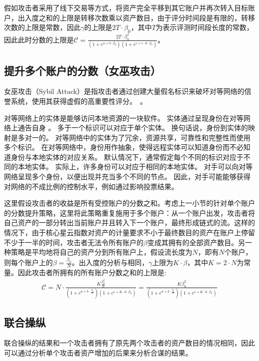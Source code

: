 假如攻击者采用了线下交易等方式，将资产完全平移到其它账户并再次转入目标账户，出入度之和的上限是转移次数乘以资产数目，由于评分时间段是有限的，转移次数的上限是常数，因此$\gamma$的上限是$2T \cdot \beta_0$，其中$T$为表示评测时间段长度的常数，因此此时分数的上限是$\mathcal{C} =  \frac{2T \cdot \beta_0 ^2}{ (1+e^{a + b \cdot \beta_0}) (1+e^{c + c \cdot d \cdot \beta_0})}$。

\subsection{提升多个账户的分数（女巫攻击）}
女巫攻击（Sybil Attack）是指攻击者通过创建大量假名标识来破坏对等网络的信誉系统，使用其获得虚假的高重要性评分。~\cite{quercia2010sybil}。


对等网络上的实体是能够访问本地资源的一块软件。 实体通过呈现身份在对等网络上通告自身 。 多于一个标识可以对应于单个实体。
换句话说，身份到实体的映射是多对一的。 对等网络中的实体为了冗余，资源共享，可靠性和完整性而使用多个标识。
在对等网络中，身份用作抽象，使得远程实体可以知道身份而不必知道身份与本地实体的对应关系。
默认情况下，通常假定每个不同的标识对应于不同的本地实体。 实际上，许多身份可以对应于相同的本地实体。
对手可以向对等网络呈现多个身份，以便出现并充当多个不同的节点。 因此，对手可能能够获得对网络的不成比例的控制水平，例如通过影响投票结果。


这里假设攻击者的收益是所有受控账户的分数之和。考虑上一小节的针对单个账户的分数提升策略，这里将此策略重复施用于多个账户：从一个账户出发，攻击者将自己资产的一部分转出当前账户并且转入下一个账户，最终形成链式的流。这样的情况下，由于核心星云指数对资产的计量要求不小于最终数目的资产在账户上停留不少于一半的时间，攻击者无法令所有账户的$\beta$变成其拥有的全部资产数目。另一种策略是平均地将自己的资产分到所有账户上，假设流长度为$N$，即有$N$个账户，则每个账户上的$\beta = \frac{\beta_0}{N}$。出入度的分析与相同，$\gamma$上限为$K \cdot \beta$，其中$K=2\cdot N$为常量。因此攻击者所拥有的所有账户分数之和的上限是:
\begin{align}
\mathcal{C} = N \cdot \frac{K \frac{\beta_0 ^2}{N}}{ (1+e^{a + b \cdot \frac{\beta_0}{N} }) (1+e^{c + K \cdot d \cdot \beta_0})} = \frac{K \beta_0 ^2 }{ (1+e^{a + b \cdot \frac{\beta_0}{N} }) (1+e^{c + K \cdot d \cdot \beta_0})} 
\end{align}


\subsection{联合操纵 \label{sec:coalition}}
联合操纵的结果和一个攻击者拥有了原先两个攻击者的资产数目的情况相同，因此可以通过分析单个攻击者资产增加的后果来分析合谋的结果。

